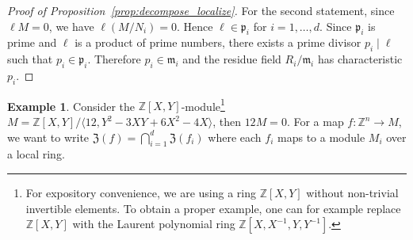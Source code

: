 \documentclass[letterpaper, 11pt, thm-restate]{article}
\numberwithin{equation}{section}
\newcommand{\Z}{\mathbb{Z}}
\newcommand{\N}{\mathbb{N}}
\newcommand{\mZ}{\mathfrak{Z}}
\newcommand{\gen}[1]{\langle {#1} \rangle}
\newcommand{\frp}{\mathfrak{p}}
\newcommand{\frm}{\mathfrak{m}}
\theoremstyle{definition}
\theoremstyle{definition}
\newtheorem{example}[theorem]{Example}
\theoremstyle{definition}
\begin{document}
\begin{proof}[Proof of Proposition~\ref{prop:decompose_localize}]
    For the second statement, since $\ell M = 0$, we have $\ell (M/N_i) = 0$.
    Hence $\ell \in \frp_i$ for $i = 1, \ldots, d$.
    Since $\frp_i$ is prime and $\ell$ is a product of prime numbers, there exists a prime divisor $p_i\mid\ell$ such that $p_i \in \frp_i$.
    Therefore $p_i \in \frm_i$ and the residue field $R_i/\frm_i$ has characteristic $p_i$.
\end{proof}

\begin{example}\label{example:decompose}
    Consider the $\Z[X, Y]$-module\footnote{For expository convenience, we are using a ring $\Z[X, Y]$ without non-trivial invertible elements.
    To obtain a proper example, one can for example replace $\Z[X, Y]$ with the Laurent polynomial ring $\Z[X, X^{-1}, Y, Y^{-1}]$.} $M = \Z[X, Y]/\gen{12, Y^2-3XY+6X^2-4X}$, then $12M = 0$.
    For a map $f \colon \Z^n \rightarrow M$, we want to write $\mZ(f) = \bigcap_{i = 1}^d \mZ(f_i)$ where each $f_i$ maps to a module $M_i$ over a local ring.
    

\end{example}
\end{document}
